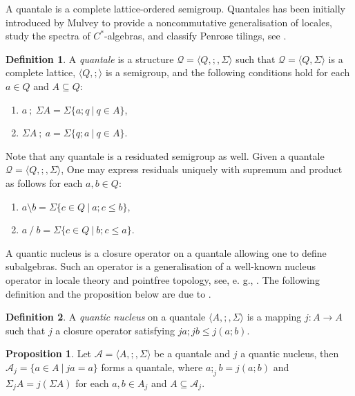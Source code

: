 \documentclass[a4paper]{article}
\theoremstyle{definition}
\newtheorem{definition}{Definition}
\theoremstyle{theorem}
\theoremstyle{proposition}
\newtheorem{proposition}{Proposition}
\theoremstyle{lemma}
\theoremstyle{ex}
\theoremstyle{corollary}
\theoremstyle{claim}
\begin{document}
A quantale is a complete lattice-ordered semigroup. Quantales has been initially introduced by Mulvey to provide a noncommutative generalisation of locales, study the spectra of $C^{*}$-algebras, and classify Penrose tilings, see \cite{mulvey1986suppl} \cite{mulvey2005noncommutative}.

\begin{definition}
  A \emph{quantale} is a structure $\mathcal{Q} = \langle Q, ;, \Sigma \rangle$ such that $\mathcal{Q} = \langle Q, \Sigma \rangle$ is a complete lattice, $\langle Q, ; \rangle$ is a semigroup, and the following conditions hold for each $a \in Q$ and $A \subseteq Q$:
  \begin{enumerate}
    \item $a \: ; \: \Sigma A = \Sigma \{ a ; q \: | \: q \in A \}$,
    \item $\Sigma A \: ; \: a = \Sigma \{ q ; a \: | \: q \in A \}$.
  \end{enumerate}
\end{definition}

Note that any quantale is a residuated semigroup as well. Given a quantale $\mathcal{Q} = \langle Q, ;, \Sigma \rangle$, One may express residuals uniquely with supremum and product as follows for each $a, b \in Q$:
\begin{enumerate}
  \item $a \setminus b = \Sigma \{ c \in Q \: | \: a ; c \leq b \}$,
  \item $a \: / \: b = \Sigma \{ c \in Q\: | \: b ; c \leq a \}$.
\end{enumerate}

A quantic nucleus is a closure operator on a quantale allowing one to define subalgebras. Such an operator is a generalisation of a well-known nucleus operator in locale theory and pointfree topology, see, e. g., \cite{bezhanishvili2016locales}. The following definition and the proposition below are due to \cite[Theorem 3.1.1]{rosenthal1990quantales}.
\begin{definition}
  A \emph{quantic nucleus} on a quantale $\langle A, ;, \Sigma \rangle$ is a mapping $j : A \to A$ such that $j$ a closure operator satisfying $j a ; j b \leq j (a ; b)$.
\end{definition}

\begin{proposition} \label{subsemi}
  Let $\mathcal{A} = \langle A, ;, \Sigma \rangle$ be a quantale and $j$ a quantic nucleus, then
  $\mathcal{A}_j = \{ a \in A \: | \: j a = a \}$ forms a quantale, where $a ;_j b = j(a ; b)$ and $\Sigma_j A = j (\Sigma A)$ for each $a, b \in {A}_j$ and $A \subseteq \mathcal{A}_j$.
\end{proposition}
\end{document}
